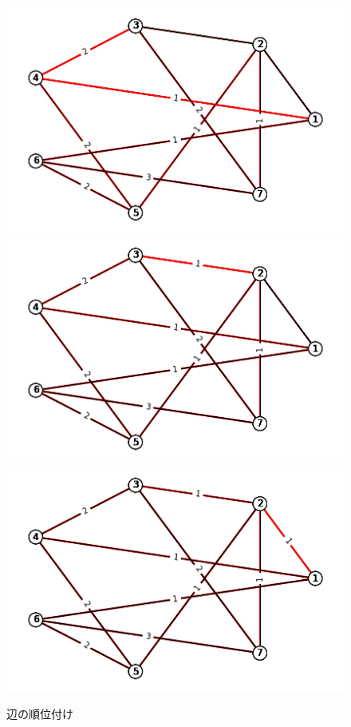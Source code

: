 \documentclass{report}
\begin{document}
\begin{CJK}{UTF8}{min}
\begin{figure}
        \includegraphics[width=.49\textwidth]{data/ex-8-F-4.png}
        \\[\smallskipamount]
        \includegraphics[width=.49\textwidth]{data/ex-8-F-5.png}\hfill
        \includegraphics[width=.49\textwidth]{data/ex-8-F-6.png}
        \caption{辺の順位付け}
    \end{figure}

    \clearpage

\end{CJK}
\end{document}
